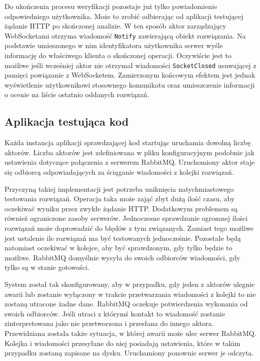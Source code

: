 \documentclass[brudnopis]{xmgr}
\begin{document}
Do ukończenia procesu weryfikacji pozostaje już tylko powiadomienie odpowiedniego użytkownika. Może to zrobić odbierając od aplikacji testującej żądanie HTTP po skończonej analizie. W ten sposób aktor zarządzający WebSocketami otrzyma wiadomość \texttt{Notify} zawierającą obiekt rozwiązania. Na podstawie umieszonego w nim identyfikatora użytkownika serwer wyśle informację do właściwego klienta o skończonej operacji. Oczywiście jest to możliwe jeśli wcześniej aktor nie otrzymał wiadomości \texttt{SocketClosed} usuwającej z pamięci powiązanie z WebSocketem. Zamierzonym końcowym efektem jest jednak wyświetlenie użytkownikowi stosownego komunikatu oraz umieszczenie informacji o ocenie na liście ostatnio oddanych rozwiązań. 

\subsection{Aplikacja testująca kod}
 
Każda instancja aplikacji sprawdzającej kod startując uruchamia dowolną liczbę aktorów. Liczba aktorów jest zdefiniowana w pliku konfiguracyjnym podobnie jak ustawienia dotyczące połączenia z serwerem RabbitMQ. Uruchomiony aktor staje się odbiorcą odpowiadających za ściąganie wiadomości z kolejki rozwiązań. 

Przyczyną takiej implementacji jest potrzeba uniknięcia natychmiastowego testowania rozwiązań. Operacja taka może zająć zbyt dużą ilość czasu, aby oczekiwać wyniku przez zwykłe żądanie HTTP. Dodatkowym problemem są również ograniczone zasoby serwerów. Jednoczesne sprawdzanie ogromnej ilości rozwiązań może doprowadzić do błędów z tym związanych. Zamiast tego możliwe jest ustalenie ile rozwiązań ma być testowanych jednocześnie. Pozostałe będą natomiast oczekiwać w kolejce, aby być sprawdzonym, gdy tylko będzie to możliwe. RabbitMQ domyślnie wysyła do swoich odbiorców wiadomości, gdy tylko są w stanie gotowości.

System został tak skonfigurowany, aby w przypadku, gdy jeden z aktorów ulegnie awarii lub zostanie wyłączony w trakcie przetwarzania wiadomości z kolejki to nie zostaną utracone żadne dane. RabbitMQ oczekuje potwierdzenia wykonania od swoich odbiorców. Jeśli utraci z którymś kontakt to wiadomość zostanie zinterpretowana jako nie przetworzona i przesłana do innego aktora. Przewidziana została także sytuacja, w której awarii może ulec serwer RabbitMQ. Kolejka i wiadomości przesyłane do niej posiadają ustawienia, które w takim przypadku zostaną zapisane na dysku. Uruchamiony ponownie serwer je odczyta. 
\end{document}
